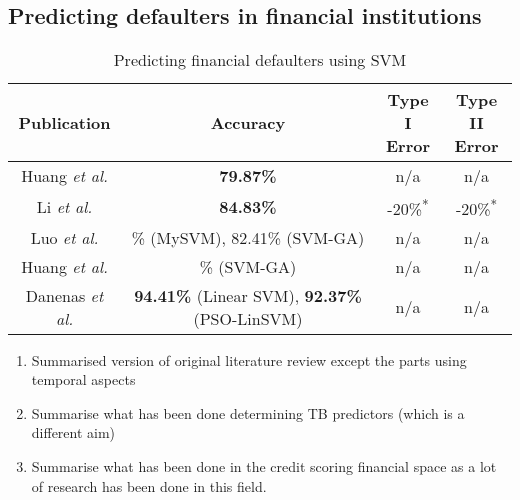 \documentclass{sig-alternate-05-2015}
\begin{document}
\subsection{Predicting defaulters in financial institutions}
\begin{table}
	\small
	\caption{Predicting financial defaulters using SVM\textsuperscript{\textparagraph}}
	\label{table:SVM}	
	\begin{tabular}{c|c|c|c} \hline		
		Publication&Accuracy&\parbox[t]{1.2cm}{\centering Type I\\Error}&\parbox[t]{1.2cm}{\centering Type II\\Error}\rule{0pt}{3mm}\rule[-0mm]{0pt}{0pt}\\ \hline
		\parbox[t]{2.3cm}{Huang \textit{et al.} \cite{Huang2004543}}
		&\parbox[t]{2.3cm}{\centering \textbf{79.87\%}\textsuperscript{\textdagger}}
		&\parbox[t]{1.1cm}{\centering n/a}
		&\parbox[t]{1.2cm}{\centering n/a}\rule{0pt}{3.5mm}\rule[-0mm]{0pt}{0pt}\\ \hline
		\parbox[t]{2.3cm}{Li \textit{et al.} \cite{Li2006772}}
		&\parbox[t]{2.3cm}{\centering \textbf{84.83\%}}
		&\parbox[t]{1.1cm}{-20\%\textsuperscript{*}}
		&\parbox[t]{1.2cm}{-20\%\textsuperscript{*}}\\ \hline
		\parbox[t]{2.3cm}{Luo \textit{et al.} \cite{Luo20097562}}
		&\parbox[t]{2.3cm}{\% (MySVM), 82.41\% (SVM-GA)\textsuperscript{\textdagger}}
		&\parbox[t]{1.1cm}{\centering n/a}
		&\parbox[t]{1.2cm}{\centering n/a}\rule{0pt}{3.5mm}\rule[-0mm]{0pt}{0pt}\\ \hline
		\parbox[t]{2.3cm}{Huang \textit{et al.} \cite{Huang2007847}}
		&\parbox[t]{2.3cm}{\% (SVM-GA)\textsuperscript{\textdagger}}
		&\parbox[t]{1.1cm}{\centering n/a}
		&\parbox[t]{1.2cm}{\centering n/a}\rule{0pt}{3.5mm}\rule[-0mm]{0pt}{0pt}\\ \hline
		\parbox[t]{2.3cm}{Danenas \textit{et al.} \cite{Danenas20153194}}
		&\parbox[t]{2.3cm}{\centering \textbf{94.41\%} (Linear SVM), \textbf{92.37\%} (PSO-LinSVM)\textsuperscript{\textdagger}}
		&\parbox[t]{1.1cm}{\centering n/a\textsuperscript{\textdaggerdbl}}
		&\parbox[t]{1.2cm}{\centering n/a\textsuperscript{\textdaggerdbl}}\rule{0pt}{3.5mm}\rule[-8mm]{0pt}{0pt}		
	\end{tabular}		
\end{table}

\begin{enumerate}
	\item Summarised version of original literature review except the parts using temporal aspects
	\item Summarise what has been done determining TB predictors (which is a different aim)
	\item Summarise what has been done in the credit scoring financial space as a lot of research has been done in this field.
\end{enumerate}
\end{document}
